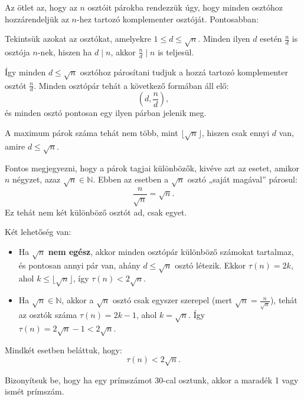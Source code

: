 \begin{solution}
Az ötlet az, hogy az $n$ osztóit párokba rendezzük úgy, hogy minden
osztóhoz hozzárendeljük az $n$-hez tartozó komplementer osztóját.
Pontosabban:

Tekintsük azokat az osztókat, amelyekre $1\leq d\leq\sqrt{n}$. Minden
ilyen $d$ esetén $\frac{n}{d}$ is osztója $n$-nek, hiszen ha $d\mid n$,
akkor $\frac{n}{d}\mid n$ is teljesül.

Így minden $d\leq\sqrt{n}$ osztóhoz párosítani tudjuk a hozzá tartozó
komplementer osztót $\frac{n}{d}$. Minden osztópár tehát a következő
formában áll elő: 
\[
(d,\frac{n}{d}),
\]
és minden osztó pontosan egy ilyen párban jelenik meg.

A maximum párok száma tehát nem több, mint $\lfloor\sqrt{n}\rfloor$,
hiszen csak ennyi $d$ van, amire $d\leq\sqrt{n}$.

Fontos megjegyezni, hogy a párok tagjai különbözők, kivéve azt az
esetet, amikor $n$ négyzet, azaz $\sqrt{n}\in\mathbb{N}$. Ebben
az esetben a $\sqrt{n}$ osztó „saját magával” párosul: 
\[
\frac{n}{\sqrt{n}}=\sqrt{n}.
\]
Ez tehát nem két különböző osztót ad, csak egyet.

Két lehetőség van: 
\begin{itemize}
\item Ha $\sqrt{n}$ \textbf{nem egész}, akkor minden osztópár különböző
számokat tartalmaz, és pontosan annyi pár van, ahány $d\leq\sqrt{n}$
osztó létezik. Ekkor $\tau(n)=2k$, ahol $k\leq\lfloor\sqrt{n}\rfloor$,
így $\tau(n)<2\sqrt{n}$. 
\item Ha $\sqrt{n}\in\mathbb{N}$, akkor a $\sqrt{n}$ osztó csak egyszer
szerepel (mert $\sqrt{n}=\frac{n}{\sqrt{n}}$), tehát az osztók száma
$\tau(n)=2k-1$, ahol $k=\sqrt{n}$. Így $\tau(n)=2\sqrt{n}-1<2\sqrt{n}$. 
\end{itemize}
Mindkét esetben beláttuk, hogy: 
\[
\tau(n)<2\sqrt{n}.
\]
\end{solution}
\begin{problem}
Bizonyítsuk be, hogy ha egy prímszámot 30-cal osztunk, akkor a maradék
1 vagy ismét prímszám. 
\end{problem}

